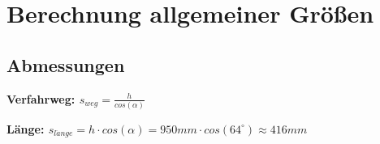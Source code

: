 \documentclass[../main.tex]{subfiles}
\begin{document}
    \section{Berechnung allgemeiner Größen}
    \subsection{Abmessungen}
    \raggedright
    \bf{Verfahrweg:} 
    $ s_{weg} = \frac{h}{cos(\alpha)} $ 

    \bf{Länge:}
        $ s_{l\ddot{a}nge} = h\cdot cos(\alpha) = 950mm \cdot cos(64^\circ) \approx 416mm$
    \newpage
\end{document}
